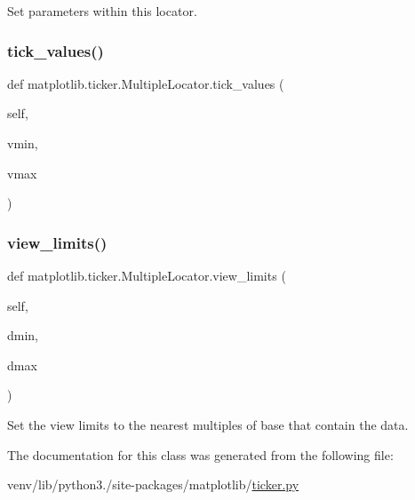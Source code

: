 \begin{DoxyVerb}Set parameters within this locator.\end{DoxyVerb}
 \mbox{\label{classmatplotlib_1_1ticker_1_1MultipleLocator_a8e868b8741569b9594271c4eaee93524}} 
\subsubsection{\texorpdfstring{tick\+\_\+values()}{tick\_values()}}
{\footnotesize\ttfamily def matplotlib.\+ticker.\+Multiple\+Locator.\+tick\+\_\+values (\begin{DoxyParamCaption}\item[{}]{self,  }\item[{}]{vmin,  }\item[{}]{vmax }\end{DoxyParamCaption})}

\mbox{\label{classmatplotlib_1_1ticker_1_1MultipleLocator_a1c06194caa2c4d1a43322868a58694f3}} 
\subsubsection{\texorpdfstring{view\+\_\+limits()}{view\_limits()}}
{\footnotesize\ttfamily def matplotlib.\+ticker.\+Multiple\+Locator.\+view\+\_\+limits (\begin{DoxyParamCaption}\item[{}]{self,  }\item[{}]{dmin,  }\item[{}]{dmax }\end{DoxyParamCaption})}

\begin{DoxyVerb}Set the view limits to the nearest multiples of base that
contain the data.
\end{DoxyVerb}
 

The documentation for this class was generated from the following file\+:\begin{DoxyCompactItemize}
\item 
venv/lib/python3./site-\/packages/matplotlib/\hyperlink{ticker_8py}{ticker.\+py}\end{DoxyCompactItemize}
